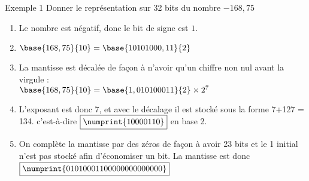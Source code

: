 \documentclass[10pt]{beamer}
\begin{document}
\begin{frame}{\Ctitle}{\stitle}
    \begin{exampleblock}{Exemple 1}
        Donner le représentation sur 32 bits du nombre $-168,75$
        \begin{enumerate}
            \item<2-> Le nombre est négatif, donc le bit de signe est \textcolor{BrickRed}{$\boxed{1}$}.
            \item<3-> $\base{168,75}{10} = \base{10101000,11}{2}$
            \item<4-> La mantisse est décalée de façon à n'avoir qu'un chiffre non nul avant la virgule : \\
            $\base{168,75}{10} = \base{1,010100011}{2} \times 2^{7}$
            \item<5-> L'exposant est donc 7, et avec le décalage il est stocké sous la forme 7+127 = 134. c'est-à-dire \textcolor{blue}{$\boxed{\numprint{10000110}}$} en base 2. 
            \item<6-> On complète la mantisse par des zéros de façon à avoir 23 bits et le 1 initial  n'est pas stocké afin d'économiser un bit. La mantisse est donc \textcolor{OliveGreen}{$\boxed{\numprint{01010001100000000000000}}$}
        \end{enumerate}
    \end{exampleblock}
\end{frame}
\end{document}
